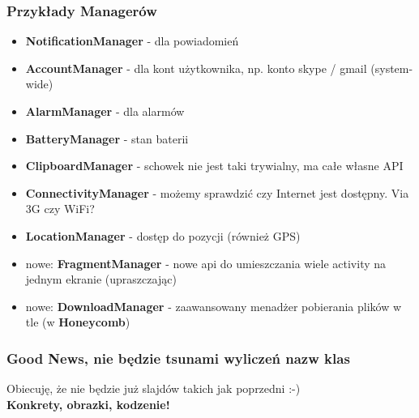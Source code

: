 \documentclass{beamer}
\begin{document}
\begin{frame}\frametitle{Przykłady Managerów}
  \begin{itemize}
    \item \textbf{NotificationManager} - dla powiadomień\\
    \pause \item \textbf{AccountManager} - dla kont użytkownika, np. konto skype / gmail (system-wide)\\
    \pause \item \textbf{AlarmManager} - dla alarmów\\
    \pause \item \textbf{BatteryManager} - stan baterii\\
    \pause \item \textbf{ClipboardManager} - schowek nie jest taki trywialny, ma całe własne API\\
    \pause \item \textbf{ConnectivityManager} - możemy sprawdzić czy Internet jest dostępny. Via 3G czy WiFi?\\
    \pause \item \textbf{LocationManager} - dostęp do pozycji (również GPS)\\
    \pause \item nowe: \textbf{FragmentManager} - nowe api do umieszczania wiele activity na jednym ekranie (upraszczając)\\
    \pause \item nowe: \textbf{DownloadManager} - zaawansowany menadżer pobierania plików w tle (w \textbf{Honeycomb})\\
  \end{itemize}
\end{frame}

\begin{frame} \frametitle{Good News, nie będzie tsunami wyliczeń nazw klas}
\begin{center}
 Obiecuję, że nie będzie już slajdów takich jak poprzedni :-) \\
 \textbf{Konkrety, obrazki, kodzenie!}
\end{center}
\end{frame}
\end{document}
